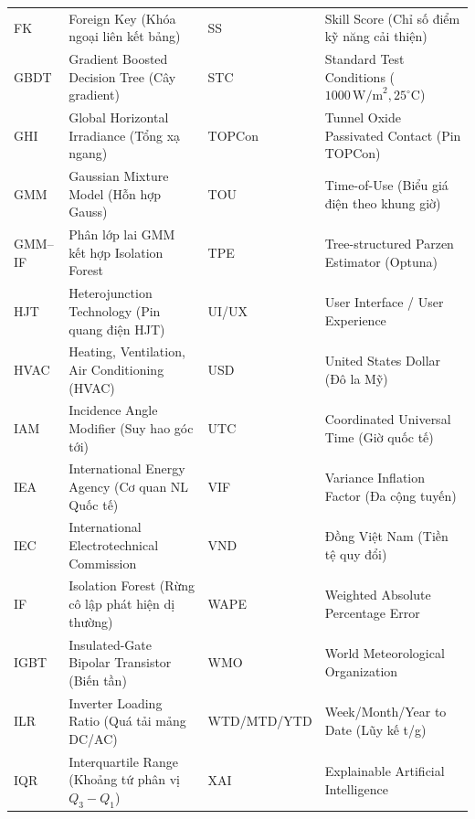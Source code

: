 \documentclass[12pt, a4paper]{report}
\begin{document}
\begin{table}[H]
\begin{tabularx}{\textwidth}{@{} l >{\raggedright\arraybackslash}X @{\hspace{8pt}} l >{\raggedright\arraybackslash}X @{}}
FK         & Foreign Key (Khóa ngoại liên kết bảng)          & SS        & Skill Score (Chỉ số điểm kỹ năng cải thiện) \\
GBDT       & Gradient Boosted Decision Tree (Cây gradient)   & STC       & Standard Test Conditions ($1000\,\text{W/m}^2, 25^\circ\text{C}$) \\
GHI        & Global Horizontal Irradiance (Tổng xạ ngang)    & TOPCon    & Tunnel Oxide Passivated Contact (Pin TOPCon) \\
GMM        & Gaussian Mixture Model (Hỗn hợp Gauss)          & TOU       & Time-of-Use (Biểu giá điện theo khung giờ) \\
GMM--IF    & Phân lớp lai GMM kết hợp Isolation Forest       & TPE       & Tree-structured Parzen Estimator (Optuna) \\
HJT        & Heterojunction Technology (Pin quang điện HJT)  & UI/UX     & User Interface / User Experience \\
HVAC       & Heating, Ventilation, Air Conditioning (HVAC)   & USD       & United States Dollar (Đô la Mỹ) \\
IAM        & Incidence Angle Modifier (Suy hao góc tới)      & UTC       & Coordinated Universal Time (Giờ quốc tế) \\
IEA        & International Energy Agency (Cơ quan NL Quốc tế)& VIF       & Variance Inflation Factor (Đa cộng tuyến) \\
IEC        & International Electrotechnical Commission       & VND       & Đồng Việt Nam (Tiền tệ quy đổi) \\
IF         & Isolation Forest (Rừng cô lập phát hiện dị thường)& WAPE    & Weighted Absolute Percentage Error \\
IGBT       & Insulated-Gate Bipolar Transistor (Biến tần)    & WMO       & World Meteorological Organization \\
ILR        & Inverter Loading Ratio (Quá tải mảng DC/AC)     & WTD/MTD/YTD & Week/Month/Year to Date (Lũy kế t/g) \\
IQR        & Interquartile Range (Khoảng tứ phân vị $Q_3-Q_1$)& XAI      & Explainable Artificial Intelligence \\
\bottomrule
\end{tabularx}
\end{table}

\newpage
\pagestyle{main}

\end{document}
